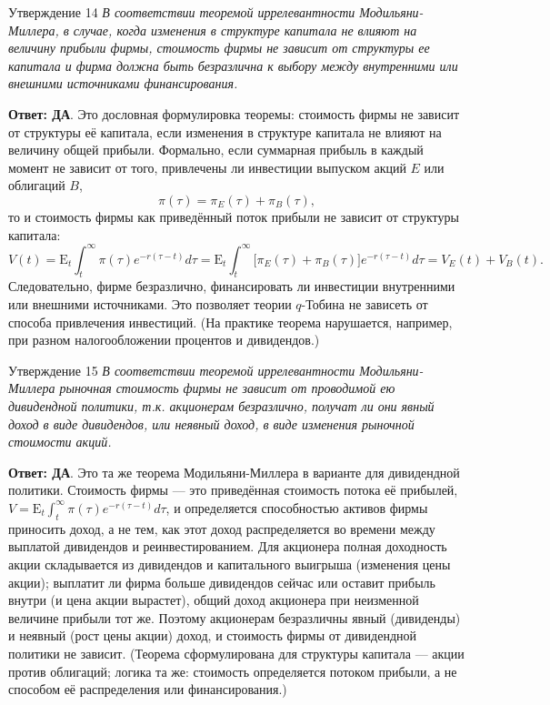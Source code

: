 \documentclass[10pt,a4paper]{article}
\newcommand{\qda}{\textbf{\color{yesgreen}Ответ: ДА}}
\newenvironment{answer}[2]{%
  \begin{qbox}{Утверждение #1}
  \textit{#2}\par\smallskip
}{%
  \end{qbox}\vspace{2pt}
}
\begin{document}
\begin{answer}{14}{В соответствии теоремой иррелевантности Модильяни-Миллера, в случае, когда изменения в структуре капитала не влияют на величину прибыли фирмы, стоимость фирмы не зависит от структуры ее капитала и фирма должна быть безразлична к выбору между внутренними или внешними источниками финансирования.}
\qda. Это дословная формулировка теоремы: стоимость фирмы не зависит от структуры её капитала, если изменения в структуре капитала не влияют на величину общей прибыли. Формально, если суммарная прибыль в каждый момент не зависит от того, привлечены ли инвестиции выпуском акций $E$ или облигаций $B$,
\[
\pi(\tau)=\pi_E(\tau)+\pi_B(\tau),
\]
то и стоимость фирмы как приведённый поток прибыли не зависит от структуры капитала:
\[
V(t)=\mathrm{E}_t\!\int_t^\infty\!\pi(\tau)e^{-r(\tau-t)}d\tau=\mathrm{E}_t\!\int_t^\infty\!\bigl[\pi_E(\tau)+\pi_B(\tau)\bigr]e^{-r(\tau-t)}d\tau=V_E(t)+V_B(t).
\]
Следовательно, фирме безразлично, финансировать ли инвестиции внутренними или внешними источниками. Это позволяет теории $q$-Тобина не зависеть от способа привлечения инвестиций. (На практике теорема нарушается, например, при разном налогообложении процентов и дивидендов.)
\end{answer}

\begin{answer}{15}{В соответствии теоремой иррелевантности Модильяни-Миллера рыночная стоимость фирмы не зависит от проводимой ею дивидендной политики, т.к. акционерам безразлично, получат ли они явный доход в виде дивидендов, или неявный доход, в виде изменения рыночной стоимости акций.}
\qda. Это та же теорема Модильяни-Миллера в варианте для дивидендной политики. Стоимость фирмы --- это приведённая стоимость потока её прибылей, $V=\mathrm{E}_t\int_t^\infty \pi(\tau)e^{-r(\tau-t)}d\tau$, и определяется способностью активов фирмы приносить доход, а не тем, как этот доход распределяется во времени между выплатой дивидендов и реинвестированием. Для акционера полная доходность акции складывается из дивидендов и капитального выигрыша (изменения цены акции); выплатит ли фирма больше дивидендов сейчас или оставит прибыль внутри (и цена акции вырастет), общий доход акционера при неизменной величине прибыли тот же. Поэтому акционерам безразличны явный (дивиденды) и неявный (рост цены акции) доход, и стоимость фирмы от дивидендной политики не зависит. (Теорема сформулирована для структуры капитала --- акции против облигаций; логика та же: стоимость определяется потоком прибыли, а не способом её распределения или финансирования.)
\end{answer}
\end{document}
